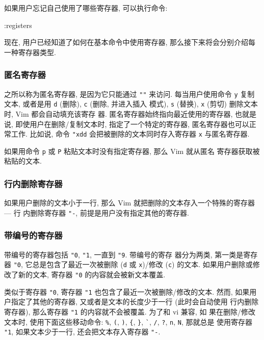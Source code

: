 如果用户忘记自己使用了哪些寄存器, 可以执行命令:
\begin{vimcode}
:registers
\end{vimcode}

现在, 用户已经知道了如何在基本命令中使用寄存器, 那么接下来将会分别介绍每
一种寄存器类型.

\subsubsection{匿名寄存器}
\label{subsubsec:the_unnamed_register}

之所以称为匿名寄存器, 是因为它只能通过 \texttt{""} 来访问. 每当用户使用命令
\texttt{y} 复制文本, 或者是用 \texttt{d} (删除), \texttt{c} (删除, 并进入插入
模式), \texttt{s} (替换), \texttt{x} (剪切) 删除文本时, Vim 都会自动填充该寄存
器. 匿名寄存器始终指向最近使用的寄存器, 也就是说, 即使用户在删除/复制文本时,
指定了一个特定的寄存器, 匿名寄存器也可以正常工作. 比如说, 命令 \texttt{"xdd}
会把被删除的文本同时存入寄存器 \texttt{x} 与匿名寄存器.

如果用命令 \texttt{p} 或 \texttt{P} 粘贴文本时没有指定寄存器, 那么 Vim 就从匿名
寄存器获取被粘贴的文本.

\subsubsection{行内删除寄存器}
\label{subsubsec:the_small_delete_register}

如果用户删除的文本小于一行, 那么 Vim 就把删除的文本存入一个特殊的寄存器 --- 行
内删除寄存器 \texttt{"-}, 前提是用户没有指定其他的寄存器.

\subsubsection{带编号的寄存器}
\label{subsubsec:the_numberred_registers}

带编号的寄存器包括 \texttt{"0}, \texttt{"1}, 一直到 \texttt{"9}. 带编号的寄存
器分为两类, 第一类是寄存器 \texttt{"0}, 它总是包含了最近一次被删除 (\texttt{d}
或 \texttt{x})/修改 (\texttt{c}) 的文本. 如果用户删除或修改了新的文本, 寄存器
\texttt{"0} 的内容就会被新文本覆盖.

类似于寄存器 \texttt{"0}, 寄存器 \texttt{"1} 也包含了最近一次被删除/修改的文本.
然而, 如果用户指定了其他的寄存器, 又或者是文本的长度少于一行 (此时会自动使用
行内删除寄存器), 那么寄存器 \texttt{"1} 的内容就不会被覆盖. 为了和 vi 兼容, 如
果在删除/修改文本时, 使用下面这些移动命令: \verb'%', \verb'(', \verb')',
\verb'{', \verb'}', \verb'`', \verb'/', \verb'?', \verb'n', \verb'N', 那就总是
使用寄存器 \texttt{"1}, 如果文本少于一行, 还会把文本存入寄存器 \texttt{"-}.

